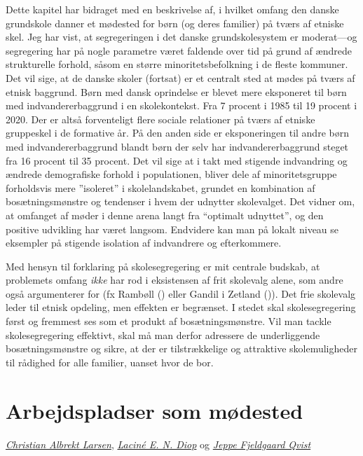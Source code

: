 \documentclass[
]{book}
\begin{document}
Dette kapitel har bidraget med en beskrivelse af, i hvilket omfang den danske grundskole danner et mødested for børn (og deres familier) på tværs af etniske skel. Jeg har vist, at segregeringen i det danske grundskolesystem er moderat---og segregering har på nogle parametre været faldende over tid på grund af ændrede strukturelle forhold, såsom en større minoritetsbefolkning i de fleste kommuner. Det vil sige, at de danske skoler (fortsat) er et centralt sted at mødes på tværs af etnisk baggrund. Børn med dansk oprindelse er blevet mere eksponeret til børn med indvandererbaggrund i en skolekontekst. Fra 7 procent i 1985 til 19 procent i 2020. Der er altså forventeligt flere sociale relationer på tværs af etniske gruppeskel i de formative år. På den anden side er eksponeringen til andre børn med indvandererbaggrund blandt børn der selv har indvandererbaggrund steget fra 16 procent til 35 procent. Det vil sige at i takt med stigende indvandring og ændrede demografiske forhold i populationen, bliver dele af minoritetsgruppe forholdsvis mere ''isoleret'' i skolelandskabet, grundet en kombination af bosætningsmønstre og tendenser i hvem der udnytter skolevalget. Det vidner om, at omfanget af møder i denne arena langt fra ``optimalt udnyttet'', og den positive udvikling har været langsom. Endvidere kan man på lokalt niveau se eksempler på stigende isolation af indvandrere og efterkommere.

Med hensyn til forklaring på skolesegregering er mit centrale budskab, at problemets omfang \emph{ikke} har rod i eksistensen af frit skolevalg alene, som andre også argumenterer for (fx Rambøll () eller Gandil i Zetland ()). Det frie skolevalg leder til etnisk opdeling, men effekten er begrænset. I stedet skal skolesegregering først og fremmest ses som et produkt af bosætningsmønstre. Vil man tackle skolesegregering effektivt, skal må man derfor adressere de underliggende bosætningsmønstre og sikre, at der er tilstrækkelige og attraktive skolemuligheder til rådighed for alle familier, uanset hvor de bor.

\chapter{Arbejdspladser som mødested}\label{kap5}

\thispagestyle{empty}

\emph{\href{https://vbn.aau.dk/en/persons/albrekt}{Christian Albrekt Larsen}}, \emph{\href{https://vbn.aau.dk/en/persons/led}{Laciné E. N. Diop}} og \emph{\href{https://vbn.aau.dk/da/persons/jeppefl}{Jeppe Fjeldgaard Qvist}}
\end{document}
